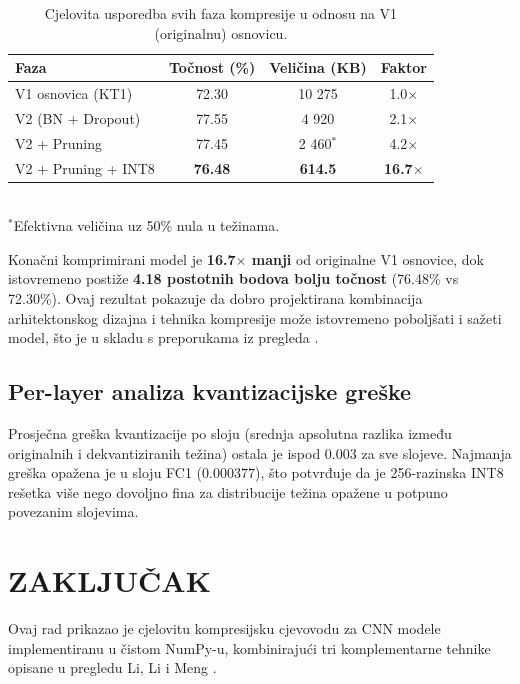 \documentclass[letterpaper, 10 pt, conference]{ieeeconf}
\begin{document}
\begin{table}[h]
\caption{Cjelovita usporedba svih faza kompresije u odnosu na V1 (originalnu) osnovicu.}
\label{tab:full_pipeline}
\begin{center}
\footnotesize
\begin{tabular}{lccc}
\toprule
\textbf{Faza} & \textbf{Točnost (\%)} & \textbf{Veličina (KB)} & \textbf{Faktor} \\
\midrule
V1 osnovica (KT1)            & 72.30 & 10 275 & 1.0$\times$ \\
V2 (BN + Dropout)            & 77.55 & 4 920  & 2.1$\times$ \\
V2 + Pruning                 & 77.45 & 2 460$^{*}$ & 4.2$\times$ \\
V2 + Pruning + INT8          & \textbf{76.48} & \textbf{614.5} & \textbf{16.7$\times$} \\
\bottomrule
\end{tabular}
\\[2pt]
{\scriptsize $^{*}$Efektivna veličina uz 50\% nula u težinama.}
\end{center}
\end{table}

Konačni komprimirani model je \textbf{16.7$\times$ manji} od originalne V1 osnovice, dok istovremeno postiže \textbf{4.18 postotnih bodova bolju točnost} (76.48\% vs 72.30\%).
Ovaj rezultat pokazuje da dobro projektirana kombinacija arhitektonskog dizajna i tehnika kompresije može istovremeno poboljšati i sažeti model, što je u skladu s preporukama iz pregleda \cite{li2023survey}.

\subsection{Per-layer analiza kvantizacijske greške}

Prosječna greška kvantizacije po sloju (srednja apsolutna razlika između originalnih i dekvantiziranih težina) ostala je ispod $0.003$ za sve slojeve.
Najmanja greška opažena je u sloju FC1 ($0.000377$), što potvrđuje da je 256-razinska INT8 rešetka više nego dovoljno fina za distribucije težina opažene u potpuno povezanim slojevima.

\section{\textbf{ZAKLJUČAK}}

Ovaj rad prikazao je cjelovitu kompresijsku cjevovodu za CNN modele implementiranu u čistom NumPy-u, kombinirajući tri komplementarne tehnike opisane u pregledu Li, Li i Meng \cite{li2023survey}.
\end{document}
